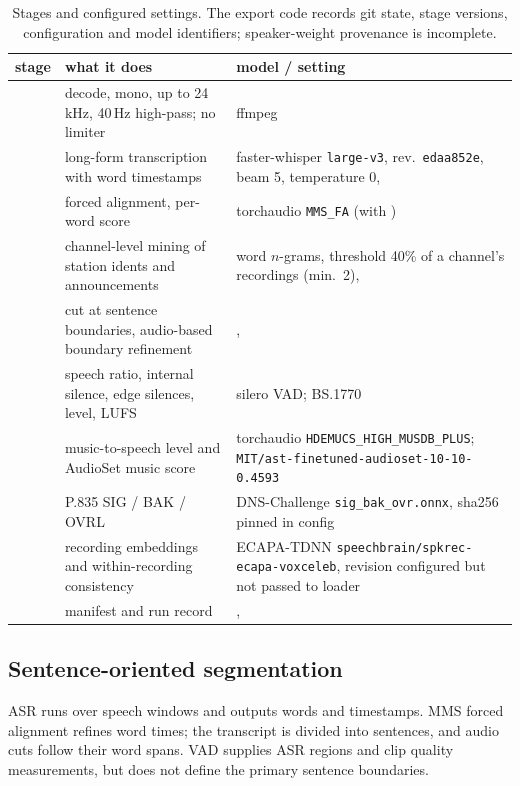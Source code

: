 \documentclass[11pt,a4paper]{article}
\begin{document}
\begin{table}[t]
\centering
\small
\begin{tabular}{L{2.1cm}L{5.1cm}L{7.4cm}}
\toprule
stage & what it does & model / setting \\
\midrule
{} & decode, mono, up to 24\,kHz, 40\,Hz high-pass; no limiter & ffmpeg \\
 & long-form transcription with word timestamps & faster-whisper \texttt{large-v3}, rev.\ \texttt{edaa852e}, beam 5, temperature 0,  \\
 & forced alignment, per-word score & torchaudio \texttt{MMS\_FA} (with ) \\
 & channel-level mining of station idents and announcements & word $n$-grams, threshold 40\% of a channel's recordings (min.\ 2),  \\
 & cut at sentence boundaries, audio-based boundary refinement & ,  \\
 & speech ratio, internal silence, edge silences, level, LUFS & silero VAD; BS.1770 \\
 & music-to-speech level and AudioSet music score & torchaudio \texttt{HDEMUCS\_HIGH\_MUSDB\_PLUS}; \texttt{MIT/ast-finetuned-audioset-10-10-0.4593} \\
 & P.835 SIG / BAK / OVRL & DNS-Challenge \texttt{sig\_bak\_ovr.onnx}, sha256 pinned in config \\
 & recording embeddings and within-recording consistency & ECAPA-TDNN \texttt{speechbrain/spkrec-ecapa-voxceleb}, revision configured but not passed to loader \\
 & manifest and run record & ,  \\
\bottomrule
\end{tabular}
\caption{Stages and configured settings. The export code records git state,
stage versions, configuration and model identifiers; speaker-weight
provenance is incomplete.}
\label{tab:stages}
\end{table}

\subsection{Sentence-oriented segmentation}
ASR runs over speech windows and outputs words and timestamps. MMS forced
alignment refines word times; the transcript is divided into sentences, and
audio cuts follow their word spans. VAD supplies ASR regions and clip quality
measurements, but does not define the primary sentence boundaries.
\end{document}
